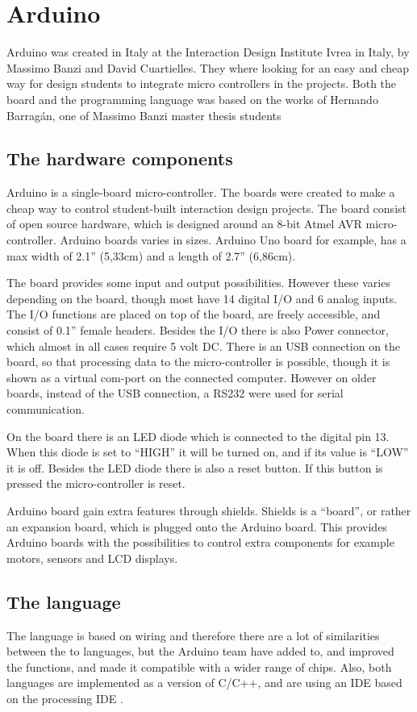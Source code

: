 \section{Arduino}
Arduino was created in Italy at the Interaction Design Institute Ivrea in Italy, by Massimo Banzi and David Cuartielles. They where looking for an easy and cheap way for design students to integrate micro controllers in the projects\cite{arduino:hist}. Both the board and the programming language was based on the works of Hernando Barragán, one of Massimo Banzi master thesis students \cite{Wiring:thesis}

\subsection{The hardware components}
Arduino is a single-board micro-controller\cite{Arduino}.
The boards were created to make a cheap way to control student-built interaction design projects. The board consist of open source hardware, which is designed around an 8-bit Atmel AVR micro-controller. Arduino boards varies in sizes. Arduino Uno board for example, has a max width of 2.1'' (5,33cm) and a length of 2.7'' (6,86cm). 

The board provides some input and output possibilities. However these varies depending on the board, though most have 14 digital I/O and 6 analog inputs. The I/O functions are placed on top of the board, are freely accessible, and consist of 0.1'' female headers. Besides the I/O there is also Power connector, which almost in all cases require 5 volt DC. There is an USB connection on the board, so that processing data to the micro-controller is possible, though it is shown as a virtual com-port on the connected computer. However on older boards, instead of the USB connection, a RS232 were used for serial communication. 

On the board there is an LED diode which is connected to the digital pin 13. When this diode is set to ``HIGH'' it will be turned on, and if its value is ``LOW'' it is off. Besides the LED diode there is also a reset button. If this button is pressed the micro-controller is reset. 

Arduino board gain extra features through shields. Shields is a ``board'', or rather an expansion board, which is plugged onto the Arduino board. This provides Arduino boards with the possibilities to control extra components for example motors, sensors and LCD displays.

\subsection{The language}
The language is based on wiring and therefore there are a lot of similarities between the to languages, but the Arduino team have added to, and improved the functions, and made it compatible with a wider range of chips. Also, both languages are implemented as a  version of C/C++, and are using an IDE based on the processing IDE \cite{Wiring:thesis}\cite{Arduino:IDE}.\\

